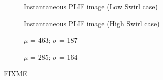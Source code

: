 \begin{figure}

\centering

\hfill
\begin{subfigure}{0.45\linewidth}
  \centering
  
  \caption{Instantaneous PLIF image (Low Swirl case)}
  \label{fig:referenceVelocityLowVelPLIFImage}
\end{subfigure}
\hfill
\begin{subfigure}{0.45\linewidth}
  \centering
  
  \caption{Instantaneous PLIF image (High Swirl case)}
  \label{fig:referenceVelocityHighVelPLIFImage}
\end{subfigure}
\hfill

\hfill
\begin{subfigure}{0.45\linewidth}
  \centering
  
  \caption{\(\mu\) = 463; \(\sigma\) = 187}
  \label{fig:referenceVelocityLowVelPLIFHistogram}
\end{subfigure}
\hfill
\begin{subfigure}{0.45\linewidth}
  \centering
  
  \caption{\(\mu\) = 285; \(\sigma\) = 164}
  \label{fig:referenceVelocityHighVelPLIFHistogram}
\end{subfigure}
\hfill

\caption[Effect of Swirl on Flame Structure]{FIXME}

\label{fig:swirlPLIFResults}

\end{figure}

